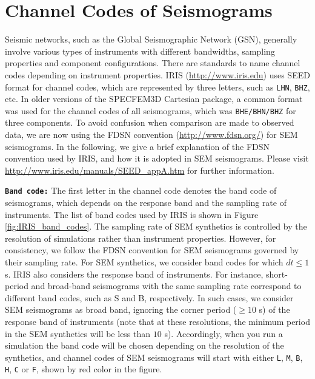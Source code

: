 
\chapter{Channel Codes of Seismograms}\label{cha:channel-codes}


Seismic networks, such as the Global Seismographic Network (GSN),
generally involve various types of instruments with different bandwidths,
sampling properties and component configurations. There are standards
to name channel codes depending on instrument properties. IRIS (\url{http://www.iris.edu})
uses SEED format for channel codes, which are represented by three
letters, such as \texttt{LHN}, \texttt{BHZ}, etc. In older versions
of the SPECFEM3D Cartesian package, a common format was used for the
channel codes of all seismograms, which was \texttt{BHE/BHN/BHZ} for
three components. To avoid confusion when comparison are made to observed
data, we are now using the FDSN convention (\url{http://www.fdsn.org/})
for SEM seismograms. In the following, we give a brief explanation
of the FDSN convention used by IRIS, and how it is adopted in SEM
seismograms. Please visit \url{http://www.iris.edu/manuals/SEED_appA.htm}
for further information.\newline


\noindent \texttt{\textbf{Band code:}} The first letter in the channel
code denotes the band code of seismograms, which depends on the response
band and the sampling rate of instruments. The list of band codes
used by IRIS is shown in Figure \ref{fig:IRIS_band_codes}. The sampling
rate of SEM synthetics is controlled by the resolution of simulations
rather than instrument properties. However, for consistency, we follow
the FDSN convention for SEM seismograms governed by their sampling
rate. For SEM synthetics, we consider band codes for which $dt\leq1$
s. IRIS also considers the response band of instruments. For instance,
short-period and broad-band seismograms with the same sampling rate
correspond to different band codes, such as S and B, respectively.
In such cases, we consider SEM seismograms as broad band, ignoring
the corner period ($\geq10$ s) of the response band of instruments
(note that at these resolutions, the minimum period in the SEM synthetics
will be less than $10$ s). Accordingly, when you run a simulation
the band code will be chosen depending on the resolution of the synthetics,
and channel codes of SEM seismograms will start with either \texttt{L},
\texttt{M}, \texttt{B}, \texttt{H}, \texttt{C} or \texttt{F}, shown
by red color in the figure.\newline


